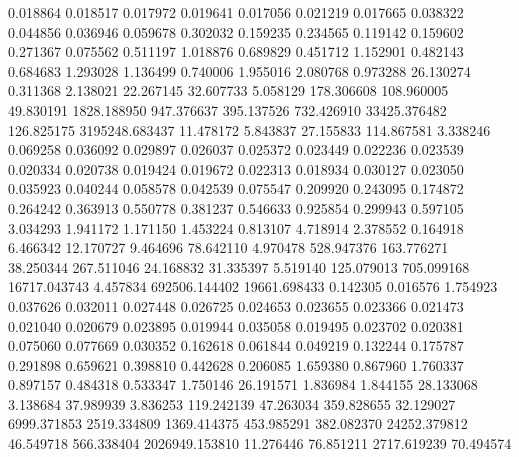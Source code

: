 0.018864
0.018517
0.017972
0.019641
0.017056
0.021219
0.017665
0.038322
0.044856
0.036946
0.059678
0.302032
0.159235
0.234565
0.119142
0.159602
0.271367
0.075562
0.511197
1.018876
0.689829
0.451712
1.152901
0.482143
0.684683
1.293028
1.136499
0.740006
1.955016
2.080768
0.973288
26.130274
0.311368
2.138021
22.267145
32.607733
5.058129
178.306608
108.960005
49.830191
1828.188950
947.376637
395.137526
732.426910
33425.376482
126.825175
3195248.683437
11.478172
5.843837
27.155833
114.867581
3.338246
0.069258
0.036092
0.029897
0.026037
0.025372
0.023449
0.022236
0.023539
0.020334
0.020738
0.019424
0.019672
0.022313
0.018934
0.030127
0.023050
0.035923
0.040244
0.058578
0.042539
0.075547
0.209920
0.243095
0.174872
0.264242
0.363913
0.550778
0.381237
0.546633
0.925854
0.299943
0.597105
3.034293
1.941172
1.171150
1.453224
0.813107
4.718914
2.378552
0.164918
6.466342
12.170727
9.464696
78.642110
4.970478
528.947376
163.776271
38.250344
267.511046
24.168832
31.335397
5.519140
125.079013
705.099168
16717.043743
4.457834
692506.144402
19661.698433
0.142305
0.016576
1.754923
0.037626
0.032011
0.027448
0.026725
0.024653
0.023655
0.023366
0.021473
0.021040
0.020679
0.023895
0.019944
0.035058
0.019495
0.023702
0.020381
0.075060
0.077669
0.030352
0.162618
0.061844
0.049219
0.132244
0.175787
0.291898
0.659621
0.398810
0.442628
0.206085
1.659380
0.867960
1.760337
0.897157
0.484318
0.533347
1.750146
26.191571
1.836984
1.844155
28.133068
3.138684
37.989939
3.836253
119.242139
47.263034
359.828655
32.129027
6999.371853
2519.334809
1369.414375
453.985291
382.082370
24252.379812
46.549718
566.338404
2026949.153810
11.276446
76.851211
2717.619239
70.494574
